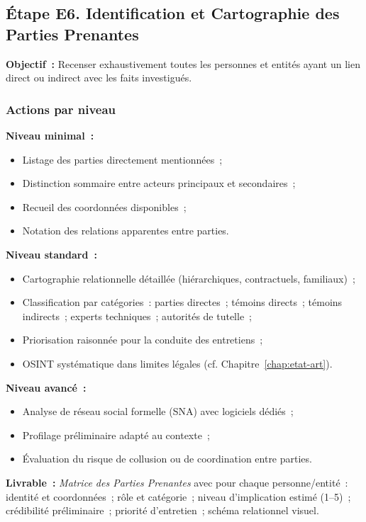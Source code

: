 \subsection{Étape E6. Identification et Cartographie des Parties Prenantes}

\textbf{Objectif~:} Recenser exhaustivement toutes les personnes et entités ayant
un lien direct ou indirect avec les faits investigués.

\subsubsection*{Actions par niveau}

\textbf{Niveau minimal~:}
\begin{itemize}
    \item Listage des parties directement mentionnées~;
    \item Distinction sommaire entre acteurs principaux et secondaires~;
    \item Recueil des coordonnées disponibles~;
    \item Notation des relations apparentes entre parties.
\end{itemize}

\textbf{Niveau standard~:}
\begin{itemize}
    \item Cartographie relationnelle détaillée (hiérarchiques, contractuels,
          familiaux)~;
    \item Classification par catégories~: parties directes~; témoins directs~;
          témoins indirects~; experts techniques~; autorités de tutelle~;
    \item Priorisation raisonnée pour la conduite des entretiens~;
    \item OSINT systématique dans limites légales (cf. Chapitre~\ref{chap:etat-art}).
\end{itemize}

\textbf{Niveau avancé~:}
\begin{itemize}
    \item Analyse de réseau social formelle (SNA) avec logiciels dédiés~;
    \item Profilage préliminaire adapté au contexte~;
    \item Évaluation du risque de collusion ou de coordination entre parties.
\end{itemize}

\textbf{Livrable~:} \textit{Matrice des Parties Prenantes} avec pour chaque
personne/entité~: identité et coordonnées~; rôle et catégorie~; niveau
d'implication estimé (1--5)~; crédibilité préliminaire~; priorité d'entretien~;
schéma relationnel visuel.

